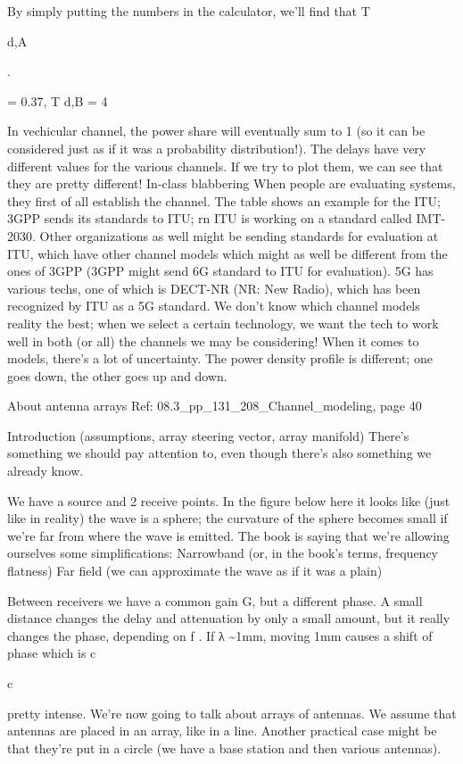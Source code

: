 {{{{By simply putting the numbers in the calculator, we'll find that T

d,A

.

= 0.37\mus, T d,B = 4\mus

In vechicular channel, the power share will eventually sum to 1 (so it can be considered just as if it was a probability distribution!).
The delays have very different values for the various channels. If we try to plot them,
we can see that they are pretty different!
In-class blabbering When people are evaluating systems, they first of all establish the channel. The table shows an example for the ITU; 3GPP sends its standards to ITU; rn ITU is working on a standard called IMT-2030. Other organizations as well might be sending standards for evaluation at ITU, which have other channel models which might as well be different from the ones of 3GPP (3GPP might send 6G standard to ITU for evaluation).
5G has various techs, one of which is DECT-NR (NR: New Radio), which has been recognized by ITU as a 5G standard.
We don't know which channel models reality the best; when we select a certain technology, we want the tech to work well in both (or all) the channels we may be considering!
When it comes to models, there's a lot of uncertainty.
The power density profile is different; one goes down, the other goes up and down.

About antenna arrays Ref: 08.3_pp_131_208_Channel_modeling, page 40

Introduction (assumptions, array steering vector, array manifold)
There's something we should pay attention to, even though there's also something we already know.

We have a source and 2 receive points. In the figure below here it looks like (just like in reality) the wave is a sphere; the curvature of the sphere becomes small if we're far from where the wave is emitted.
The book is saying that we're allowing ourselves some simplifications:
Narrowband (or, in the book's terms, frequency flatness)
Far field (we can approximate the wave as if it was a plain)

Between receivers we have a common gain G, but a different phase. A small distance changes the delay and attenuation by only a small amount, but it really changes the phase, depending on f . If λ \sim 1mm, moving 1mm causes a shift of phase which is c

c

pretty intense.
We're now going to talk about arrays of antennas.
We assume that antennas are placed in an array, like in a line. Another practical case might be that they're put in a circle (we have a base station and then various antennas).

}}}}
